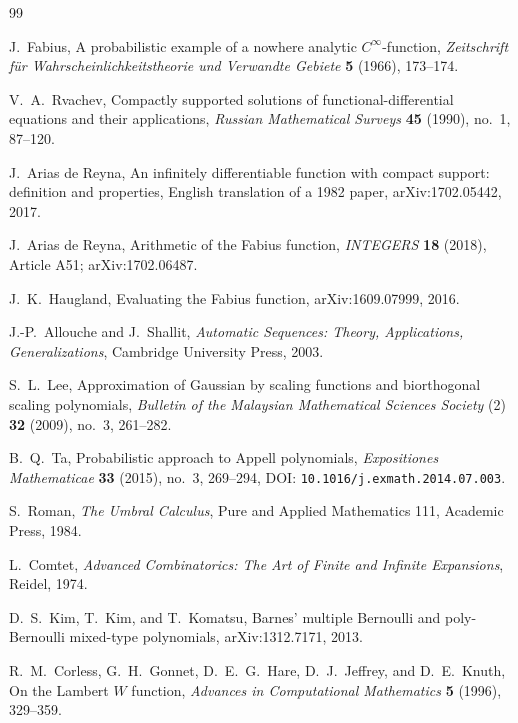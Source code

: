 \documentclass[11pt,oneside]{article}
\numberwithin{equation}{section}
\theoremstyle{definition}
\theoremstyle{remark}
\begin{document}
\begin{thebibliography}{99}

J.~Fabius,
\newblock A probabilistic example of a nowhere analytic $C^\infty$-function,
\newblock \emph{Zeitschrift f\"ur Wahrscheinlichkeitstheorie und Verwandte Gebiete}
\textbf{5} (1966), 173--174.

V.~A.~Rvachev,
\newblock Compactly supported solutions of functional-differential equations and their applications,
\newblock \emph{Russian Mathematical Surveys} \textbf{45} (1990), no.~1, 87--120.

J.~Arias de Reyna,
\newblock An infinitely differentiable function with compact support: definition and properties,
\newblock English translation of a 1982 paper, arXiv:1702.05442, 2017.

J.~Arias de Reyna,
\newblock Arithmetic of the Fabius function,
\newblock \emph{INTEGERS} \textbf{18} (2018), Article A51; arXiv:1702.06487.

J.~K.~Haugland,
\newblock Evaluating the Fabius function,
\newblock arXiv:1609.07999, 2016.

J.-P.~Allouche and J.~Shallit,
\newblock \emph{Automatic Sequences: Theory, Applications, Generalizations},
\newblock Cambridge University Press, 2003.

S.~L.~Lee,
\newblock Approximation of Gaussian by scaling functions and biorthogonal scaling polynomials,
\newblock \emph{Bulletin of the Malaysian Mathematical Sciences Society} (2)
\textbf{32} (2009), no.~3, 261--282.

B.~Q.~Ta,
\newblock Probabilistic approach to Appell polynomials,
\newblock \emph{Expositiones Mathematicae} \textbf{33} (2015), no.~3, 269--294,
DOI: \nolinkurl{10.1016/j.exmath.2014.07.003}.

S.~Roman,
\newblock \emph{The Umbral Calculus},
\newblock Pure and Applied Mathematics 111, Academic Press, 1984.

L.~Comtet,
\newblock \emph{Advanced Combinatorics: The Art of Finite and Infinite Expansions},
\newblock Reidel, 1974.

D.~S.~Kim, T.~Kim, and T.~Komatsu,
\newblock Barnes' multiple Bernoulli and poly-Bernoulli mixed-type polynomials,
\newblock arXiv:1312.7171, 2013.

R.~M.~Corless, G.~H.~Gonnet, D.~E.~G.~Hare, D.~J.~Jeffrey, and D.~E.~Knuth,
\newblock On the Lambert $W$ function,
\newblock \emph{Advances in Computational Mathematics} \textbf{5} (1996), 329--359.


\end{thebibliography}
\end{document}
